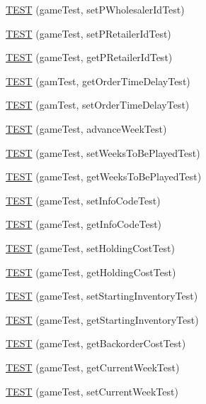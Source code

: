 \begin{DoxyCompactItemize}
\hyperlink{group__group2_gacb89ab5d3fa1011f55e2e604fb161833}{T\+E\+ST} (game\+Test, set\+P\+Wholesaler\+Id\+Test)
\item 
\hyperlink{group__group2_ga7b0dc9afd3edf6a6947d5d8e0499b0a4}{T\+E\+ST} (game\+Test, set\+P\+Retailer\+Id\+Test)
\item 
\hyperlink{group__group2_ga8024925544cf99f0e7cce5597988d8bc}{T\+E\+ST} (game\+Test, get\+P\+Retailer\+Id\+Test)
\item 
\hyperlink{group__group2_gadec269e4bc1adbd9372ba122f839d151}{T\+E\+ST} (gam\+Test, get\+Order\+Time\+Delay\+Test)
\item 
\hyperlink{group__group2_ga7200f183103052a104c989a23e1799fc}{T\+E\+ST} (gam\+Test, set\+Order\+Time\+Delay\+Test)
\item 
\hyperlink{group__group2_ga4b0d92f6129a69054e355b91993f098d}{T\+E\+ST} (game\+Test, advance\+Week\+Test)
\item 
\hyperlink{group__group2_ga6ecc7702d6197ffc0ef49cf05e2525ff}{T\+E\+ST} (game\+Test, set\+Weeks\+To\+Be\+Played\+Test)
\item 
\hyperlink{group__group2_ga2485f23f45d9ff967bbc5628f5e3cb3f}{T\+E\+ST} (game\+Test, get\+Weeks\+To\+Be\+Played\+Test)
\item 
\hyperlink{group__group2_ga197666470ad18d903e30ea79e74c13aa}{T\+E\+ST} (game\+Test, set\+Info\+Code\+Test)
\item 
\hyperlink{group__group2_ga9a536a7dc3135427bf7078aa0fa6ff7a}{T\+E\+ST} (game\+Test, get\+Info\+Code\+Test)
\item 
\hyperlink{group__group2_gafe1ed549d507505dff2e98804caa967d}{T\+E\+ST} (game\+Test, set\+Holding\+Cost\+Test)
\item 
\hyperlink{group__group2_gaf283280f1bedb6c7cf2dd66b6cd0f8ca}{T\+E\+ST} (game\+Test, get\+Holding\+Cost\+Test)
\item 
\hyperlink{group__group2_ga627c817aed1301edefb40baa79ddad22}{T\+E\+ST} (game\+Test, set\+Starting\+Inventory\+Test)
\item 
\hyperlink{group__group2_ga9ab56c8f5688c460d082f6f21ab0e3c8}{T\+E\+ST} (game\+Test, get\+Starting\+Inventory\+Test)
\item 
\hyperlink{group__group2_gab35ea165c84a93ac51e15da73e5f55c0}{T\+E\+ST} (game\+Test, get\+Backorder\+Cost\+Test)
\item 
\hyperlink{group__group2_ga7320537d208509a5c528cf94bbee8516}{T\+E\+ST} (game\+Test, get\+Current\+Week\+Test)
\item 
\hyperlink{group__group2_ga8b5c47aac0db966ef356cb734fcf045f}{T\+E\+ST} (game\+Test, set\+Current\+Week\+Test)

\end{DoxyCompactItemize}
